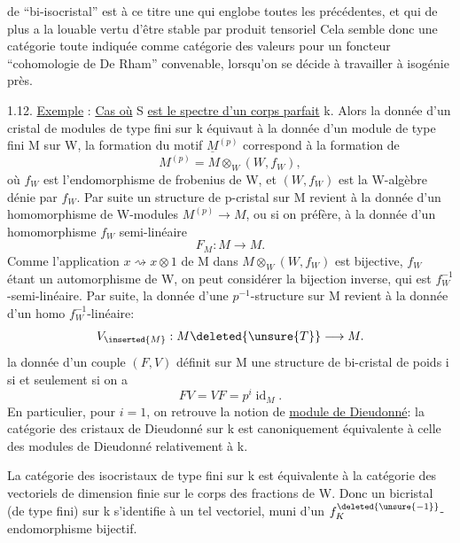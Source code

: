 
de ``bi-isocristal'' est à ce titre une   qui englobe toutes les précédentes, et qui de plus a la louable vertu d'être stable par produit tensoriel  Cela semble donc une catégorie toute indiquée  comme catégorie des valeurs pour un foncteur ``cohomologie de De Rham'' convenable, lorsqu'on se décide à travailler à isogénie près.

1.12.  \uline{Exemple} : \uline{Cas où} S \uline{est le spectre d'un corps parfait} k. Alors la donnée d'un cristal de modules de type fini sur k équivaut à la donnée d'un module de type fini M sur W, la formation du motif $\underline M^{(p)}$ correspond à la formation de
\[
M^{(p)}=M\otimes_W(W,f_W),
\]
où $f_W$ est l'endomorphisme de frobenius de W,  et $(W,f_W)$ est la W-algèbre dénie par $f_W$. Par suite un structure de p-cristal sur M revient à la donnée d'un homomorphisme de W-modules $M^{(p)}\longrightarrow M$, ou si on préfère, à la donnée d'un homomorphisme $f_W$\deleted{\unsure{,|-}} semi-linéaire
\[
F_M:M\longrightarrow M.
\]
Comme l'application $x\rightsquigarrow x\otimes1$ de M dans $M\otimes_W(W,f_W)$ est bijective, $f_W$ étant un automorphisme de W, on peut considérer la bijection inverse, qui est $f_W^{-1}$-semi-linéaire. Par suite, la donnée d'une $p^{-1}$-structure sur M revient à la donnée d'un homo $f_W^{-1}$-linéaire:
\[
V_{\inserted{M}}:M\deleted{\unsure{T}}\longrightarrow M.
\]
la donnée d'un couple $(F,V)$ définit sur M une structure de bi-cristal de poids i si et seulement si on a
\[
FV=VF=p^i\operatorname{id}_M.
\]
En particulier, pour $i=1$, on retrouve la notion de \uline{module de Dieudonné}: la catégorie des cristaux de Dieudonné sur k est canoniquement équivalente à celle des modules de Dieudonné  relativement à k.

La catégorie des isocristaux de  type fini sur k est équivalente à la catégorie des vectoriels de dimension finie sur le corps des fractions  de W. Donc un bicristal (de type fini) sur k s'identifie à un tel vectoriel, muni d'un $f_K^{\deleted{\unsure{-1}}}$-endomorphisme bijectif.
